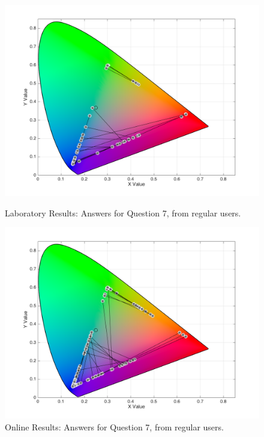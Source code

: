 \begin{figure}[!htbp]
  \centering
  \begin{minipage}{0.48\textwidth}
    \centering
    \includegraphics[width=\textwidth]{images/results/7_lab_regularUsers.png}
    \caption[Laboratory Results: Answers for Question 7, from regular users.]{Laboratory Results: Answers for Question 7, from regular users.}
    \label{fig:blueblend_1}
  \end{minipage}\hfill
  \begin{minipage}{0.48\textwidth}
    \centering
    \includegraphics[width=\textwidth]{images/results/7_online_regularUsers.png}
    \caption[Online Results: Answers for Question 7, from regular users.]{Online Results: Answers for Question 7, from regular users.}
    \label{fig:blueblend_2}
  \end{minipage}
\end{figure}
%
